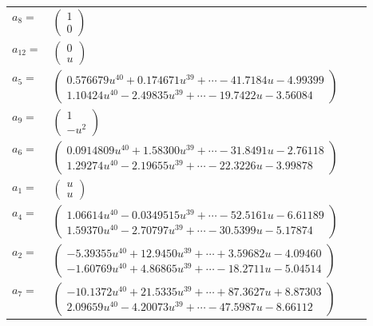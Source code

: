 \documentclass[1p]{elsarticle_modified}
\theoremstyle{definition}
\begin{document}
\begin{tabular}{m{7pt} m{180pt} m{7pt} m{180pt} }
\flushright $a_{8}=$&$\begin{pmatrix}1\\0\end{pmatrix}$ \\
\flushright $a_{12}=$&$\begin{pmatrix}0\\u\end{pmatrix}$ \\
\flushright $a_{5}=$&$\begin{pmatrix}0.576679 u^{40}+0.174671 u^{39}+\cdots-41.7184 u-4.99399\\1.10424 u^{40}-2.49835 u^{39}+\cdots-19.7422 u-3.56084\end{pmatrix}$ \\
\flushright $a_{9}=$&$\begin{pmatrix}1\\- u^2\end{pmatrix}$ \\
\flushright $a_{6}=$&$\begin{pmatrix}0.0914809 u^{40}+1.58300 u^{39}+\cdots-31.8491 u-2.76118\\1.29274 u^{40}-2.19655 u^{39}+\cdots-22.3226 u-3.99878\end{pmatrix}$ \\
\flushright $a_{1}=$&$\begin{pmatrix}u\\u\end{pmatrix}$ \\
\flushright $a_{4}=$&$\begin{pmatrix}1.06614 u^{40}-0.0349515 u^{39}+\cdots-52.5161 u-6.61189\\1.59370 u^{40}-2.70797 u^{39}+\cdots-30.5399 u-5.17874\end{pmatrix}$ \\
\flushright $a_{2}=$&$\begin{pmatrix}-5.39355 u^{40}+12.9450 u^{39}+\cdots+3.59682 u-4.09460\\-1.60769 u^{40}+4.86865 u^{39}+\cdots-18.2711 u-5.04514\end{pmatrix}$ \\
\flushright $a_{7}=$&$\begin{pmatrix}-10.1372 u^{40}+21.5335 u^{39}+\cdots+87.3627 u+8.87303\\2.09659 u^{40}-4.20073 u^{39}+\cdots-47.5987 u-8.66112\end{pmatrix}$ \\

\end{tabular}
\end{document}
